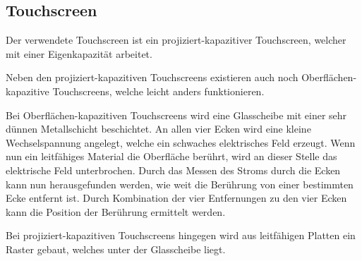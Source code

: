 \subsection{Touchscreen}

Der verwendete Touchscreen ist ein projiziert-kapazitiver Touchscreen, welcher mit einer Eigenkapazität arbeitet. \cite{ts-userManual}

Neben den projiziert-kapazitiven Touchscreens existieren auch noch Oberflächen-kapazitive Touchscreens, welche leicht anders funktionieren.

Bei Oberflächen-kapazitiven Touchscreens wird eine Glasscheibe mit einer sehr dünnen Metallschicht beschichtet.
An allen vier Ecken wird eine kleine Wechselspannung angelegt, welche ein schwaches elektrisches Feld erzeugt.
Wenn nun ein leitfähiges Material die Oberfläche berührt, wird an dieser Stelle das elektrische Feld unterbrochen.
Durch das Messen des Stroms durch die Ecken kann nun herausgefunden werden, wie weit die Berührung von einer bestimmten Ecke entfernt ist.
Durch Kombination der vier Entfernungen zu den vier Ecken kann die Position der Berührung ermittelt werden.
\cite{ts-holzinger}

Bei projiziert-kapazitiven Touchscreens hingegen wird aus leitfähigen Platten ein Raster gebaut, welches unter der Glasscheibe liegt.
\cite{ts-self_capacitive_multitouch}
